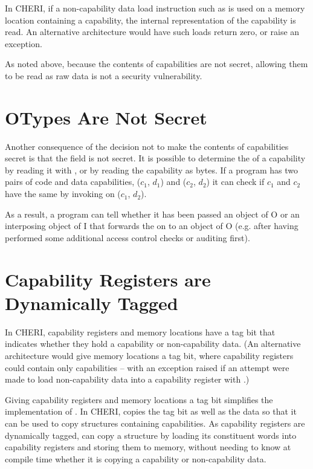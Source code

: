 In CHERI, if a non-capability data load instruction such as  is used
on a memory location containing a capability, the internal representation
of the capability is read. An alternative architecture would have
such loads return zero, or raise an exception.

As noted above,
because the contents of capabilities are not secret, allowing them to be
read as raw data is not a security vulnerability.

\section{OTypes Are Not Secret}

Another consequence of the decision not to make the contents of capabilities secret
is that the \cotype{} field is not secret. It is possible to determine the
\cotype{} of a capability by reading it with , or by
reading the capability as bytes. If a program has two pairs of code and data
capabilities, ($c_1$, $d_1$) and ($c_2$, $d_2$) it can check if $c_1$ and $c_2$
have the same \cotype{} by invoking  on ($c_1$, $d_2$).

As a result, a program can tell whether it has been passed an object of
\cotype{} O or an interposing object of \cotype{} I that  forwards the
 on to an object of \cotype{} O (e.g. after having performed
some additional access control checks or auditing first).

\section{Capability Registers are Dynamically Tagged}

In CHERI, capability registers and memory locations have a tag bit
that indicates whether they hold a capability or non-capability data.
(An alternative architecture would give memory locations a tag bit,
where capability registers could contain only capabilities -- with
an exception raised if an attempt were made to load non-capability data into a
capability register with .)

Giving capability registers and memory locations a tag bit
simplifies the implementation of .
In CHERI,  copies
the tag bit as well as the data so that it can be used to copy structures
containing capabilities. As capability registers are dynamically tagged,
 can copy a structure by loading
its constituent words into capability
registers and storing them to memory, without needing to know at compile time
whether it is copying a capability or non-capability data.

